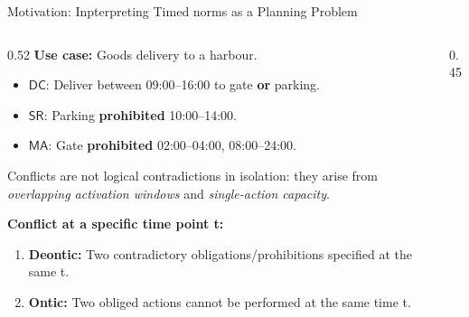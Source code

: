 \documentclass[9pt,aspectratio=169]{beamer}
\newcommand{\DC}{\ensuremath{\mathsf{DC}}\xspace}
\newcommand{\SR}{\ensuremath{\mathsf{SR}}\xspace}
\newcommand{\MA}{\ensuremath{\mathsf{MA}}\xspace}
\begin{document}




\begin{frame}{Motivation: Inpterpreting Timed norms as a Planning Problem}
\begin{columns}[T]
  \begin{column}{0.52\textwidth}
    \small
    \textbf{Use case:} Goods delivery to a harbour.

    \begin{itemize}
      \item \DC: Deliver between 09:00--16:00 to gate \textbf{or} parking.
      \item \SR: Parking \textbf{prohibited} 10:00--14:00.
      \item \MA: Gate \textbf{prohibited} 02:00--04:00, 08:00--24:00.
    \end{itemize}


    Conflicts are not logical contradictions in isolation: they arise from \emph{overlapping activation windows} and \emph{single-action capacity}.

    \medskip
    \textbf{Conflict at a specific time point t:}
    \begin{enumerate}
      \item \textcolor{ConflictRed}{\textbf{Deontic:}} Two contradictory obligations/prohibitions specified at the same t.
      \item \textcolor{ConflictOrange}{\textbf{Ontic:}} Two obliged actions cannot be performed at the same time t.
    \end{enumerate}

   
  \end{column}
  \begin{column}{0.45\textwidth}
    \centering
\end{column}
\end{columns}
\end{frame}
\end{document}

